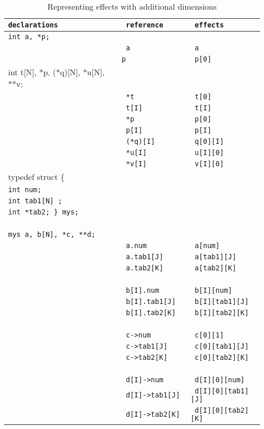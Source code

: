 \documentclass[a4paper]{report}
\begin{document}
\begin{table}[htbp]
\begin{center}
\begin{tabular}{| >{\tt}l | >{\tt}l | >{\tt}l |}

\hline
declarations & reference & effects \\ \hline

int a, *p; &   & \\
      & a & a\\
      &*p & p[0] \\\hline

int t[N], *p, (*q)[N], *u[N], **v; & & \\ 
        & *t & t[0] \\
        & t[I] & t[I] \\
        & *p & p[0] \\
         & p[I]& p[I]\\ 
        & (*q)[I] & q[0][I] \\
        & *u[I]& u[I][0]\\
        & *v[I]& v[I][0]\\\hline

typedef struct \{ & & \\
int num; && \\
int tab1[N] ; && \\
int *tab2; \} mys;&& \\
&& \\

mys a, b[N], *c, **d; & & \\
                  & a.num  & a[num] \\
                  & a.tab1[J] & a[tab1][J] \\
                  & a.tab2[K] & a[tab2][K] \\
&& \\
                  & b[I].num & b[I][num] \\
                  & b[I].tab1[J] & b[I][tab1][J]\\
                  & b[I].tab2[K]& b[I][tab2][K]\\
&& \\
                  & c->num & c[0][1]\\
                  & c->tab1[J] & c[0][tab1][J] \\
                  & c->tab2[K] & c[0][tab2][K] \\
&& \\
                  & d[I]->num & d[I][0][num]\\
                  & d[I]->tab1[J] & d[I][0][tab1][J]\\
                  & d[I]->tab2[K] & d[I][0][tab2][K]\\ \hline
                  
\end{tabular}
\end{center}
\caption{Representing effects with additional dimensions}\label{tab:effects}
\end{table}
\end{document}

